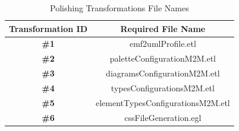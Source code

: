 \begin{table}[h]
	\caption{Polishing Transformations File Names}
	\centering
	\setlength{\tabcolsep}{3.5pt} 
	\begin{tabular}{|c|c|}
		\cline{1-2}
		\textbf{Transformation ID}  & \textbf{Required File Name}\\ \hline
		\textbf{\#1} & emf2umlProfile.etl\\ \hline
		\textbf{\#2} & paletteConfigurationM2M.etl\\ \hline
		\textbf{\#3} & diagramsConfigurationM2M.etl\\ \hline
		\textbf{\#4} & typesConfigurationsM2M.etl\\ \hline
		\textbf{\#5} & elementTypesConfigurationsM2M.etl\\ \hline
		\textbf{\#6} & cssFileGeneration.egl\\ \hline
		\cline{1-2}
	\end{tabular}
	\label{tab:polishingTransformationsNames}
\end{table}
